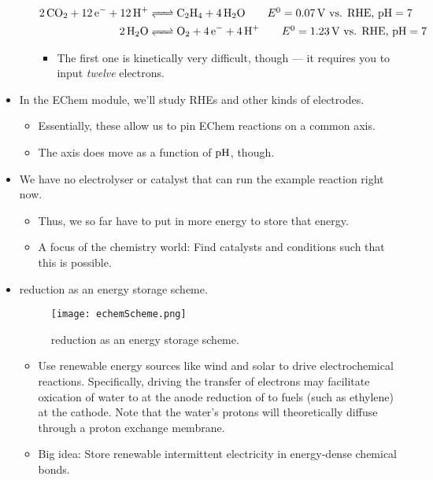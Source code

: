 \documentclass[../notes.tex]{subfiles}
\begin{document}
\begin{itemize}
\begin{itemize}
\begin{align*}
            \ce{2CO2 + 12e^- + 12H+} &\ce{<=>} \ce{C2H4 + 4H2O}\tag*{$E^0=\SI{0.07}{\volt}$ vs. RHE, $\pH=7$}\\
            \ce{2H2O} &\ce{<=>} \ce{O2 + 4e^- + 4H+}\tag*{$E^0=\SI{1.23}{\volt}$ vs. RHE, $\pH=7$}
        \end{align*}
        \begin{itemize}
            \item The first one is kinetically very difficult, though --- it requires you to input \emph{twelve} electrons.
        \end{itemize}
    \end{itemize}
    \pagebreak
    \item In the EChem module, we'll study RHEs and other kinds of electrodes.
    \begin{itemize}
        \item Essentially, these allow us to pin EChem reactions on a common axis.
        \item The axis does move as a function of $\operatorname{pH}$, though.
    \end{itemize}
    \item We have no electrolyser or catalyst that can run the example reaction right now.
    \begin{itemize}
        \item Thus, we so far have to put in more energy to store that energy.
        \item A focus of the chemistry world: Find catalysts and conditions such that this is possible.
    \end{itemize}
    \item {} reduction as an energy storage scheme.
    \begin{figure}[h!]
        \centering
        \texttt{[image: echemScheme.png]}
        \caption{ reduction as an energy storage scheme.}
        \label{fig:echemScheme}
    \end{figure}
    \begin{itemize}
        \item Use renewable energy sources like wind and solar to drive electrochemical reactions. Specifically, driving the transfer of electrons may facilitate oxication of water to  at the anode reduction of  to fuels (such as ethylene) at the cathode. Note that the water's protons will theoretically diffuse through a proton exchange membrane.
        \item Big idea: Store renewable intermittent electricity in energy-dense chemical bonds.

\end{itemize}
\end{itemize}
\end{document}
